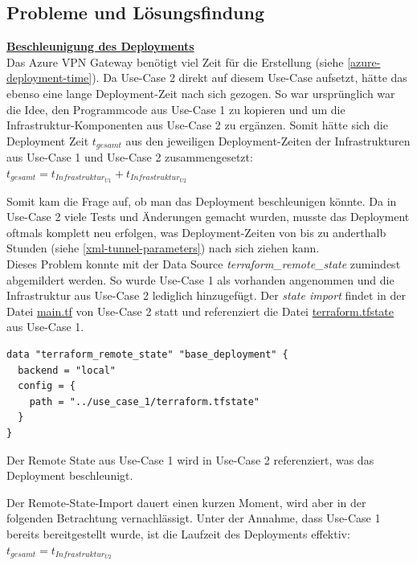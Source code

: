 \subsection{Probleme und Lösungsfindung}

\textbf{\underline{Beschleunigung des \gls{Deployment}s}}\\
Das Azure VPN Gateway benötigt viel Zeit für die Erstellung (siehe \ref{azure-deployment-time}). Da Use-Case 2 direkt auf diesem Use-Case aufsetzt, hätte das ebenso eine lange \gls{Deployment}-Zeit nach sich gezogen. So war ursprünglich war die Idee, den Programmcode aus Use-Case 1 zu kopieren und um die Infrastruktur-Komponenten aus Use-Case 2 zu ergänzen. Somit hätte sich die \gls{Deployment} Zeit $t_{gesamt}$ aus den jeweiligen \gls{Deployment}-Zeiten der Infrastrukturen aus Use-Case 1 und Use-Case 2 zusammengesetzt:\\
$t_{gesamt} = t_{Infrastruktur_{U1}} + t_{Infrastruktur_{U2}}$

Somit kam die Frage auf, ob man das \gls{Deployment} beschleunigen könnte. Da in Use-Case 2 viele Tests und Änderungen gemacht wurden, musste das \gls{Deployment} oftmals komplett neu erfolgen, was \gls{Deployment}-Zeiten von bis zu anderthalb Stunden (siehe \ref{xml-tunnel-parameters}) nach sich ziehen kann.\\
Dieses Problem konnte mit der Data Source \textit{terraform\_remote\_state} zumindest abgemildert werden\cite{remotestateimport2021}. So wurde Use-Case 1 als vorhanden angenommen und die Infrastruktur aus Use-Case 2 lediglich hinzugefügt. Der \textit{state import} findet in der Datei \underline{main.tf} von Use-Case 2 statt und referenziert die Datei \underline{terraform.tfstate} aus Use-Case 1.
\begin{listing}[h]
\begin{verbatim}
data "terraform_remote_state" "base_deployment" {
  backend = "local"
  config = {
    path = "../use_case_1/terraform.tfstate"
  }
}

\end{verbatim}
\caption{Der Remote State aus Use-Case 1 wird in Use-Case 2 referenziert, was das \gls{Deployment} beschleunigt.}
\label{tf-remote-state-import}
\end{listing}\FloatBarrier
Der Remote-State-Import dauert einen kurzen Moment, wird aber in der folgenden Betrachtung vernachlässigt.
Unter der Annahme, dass Use-Case 1 bereits bereitgestellt wurde, ist die Laufzeit des \gls{Deployment}s effektiv:\\
$t_{gesamt} = t_{Infrastruktur_{U2}}$

